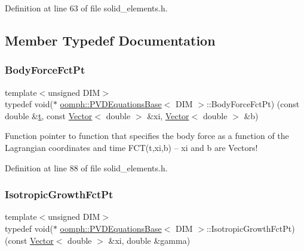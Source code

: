 Definition at line 63 of file solid\+\_\+elements.\+h.



\subsection{Member Typedef Documentation}
\mbox{\label{classoomph_1_1PVDEquationsBase_aa0d7dc7279aff03dfcc3ad35bb6653be}} 
\subsubsection{\texorpdfstring{Body\+Force\+Fct\+Pt}{BodyForceFctPt}}
{\footnotesize\ttfamily template$<$unsigned D\+IM$>$ \\
typedef void($\ast$ \hyperlink{classoomph_1_1PVDEquationsBase}{oomph\+::\+P\+V\+D\+Equations\+Base}$<$ D\+IM $>$\+::Body\+Force\+Fct\+Pt) (const double \&\hyperlink{cfortran_8h_af6f0bd3dc13317f895c91323c25c2b8f}{t}, const \hyperlink{classoomph_1_1Vector}{Vector}$<$ double $>$ \&xi, \hyperlink{classoomph_1_1Vector}{Vector}$<$ double $>$ \&b)}



Function pointer to function that specifies the body force as a function of the Lagrangian coordinates and time F\+C\+T(t,xi,b) -- xi and b are Vectors! 



Definition at line 88 of file solid\+\_\+elements.\+h.

\mbox{\label{classoomph_1_1PVDEquationsBase_a59fc7069e0330c399ff53aebb6c67729}} 
\subsubsection{\texorpdfstring{Isotropic\+Growth\+Fct\+Pt}{IsotropicGrowthFctPt}}
{\footnotesize\ttfamily template$<$unsigned D\+IM$>$ \\
typedef void($\ast$ \hyperlink{classoomph_1_1PVDEquationsBase}{oomph\+::\+P\+V\+D\+Equations\+Base}$<$ D\+IM $>$\+::Isotropic\+Growth\+Fct\+Pt) (const \hyperlink{classoomph_1_1Vector}{Vector}$<$ double $>$ \&xi, double \&gamma)}



